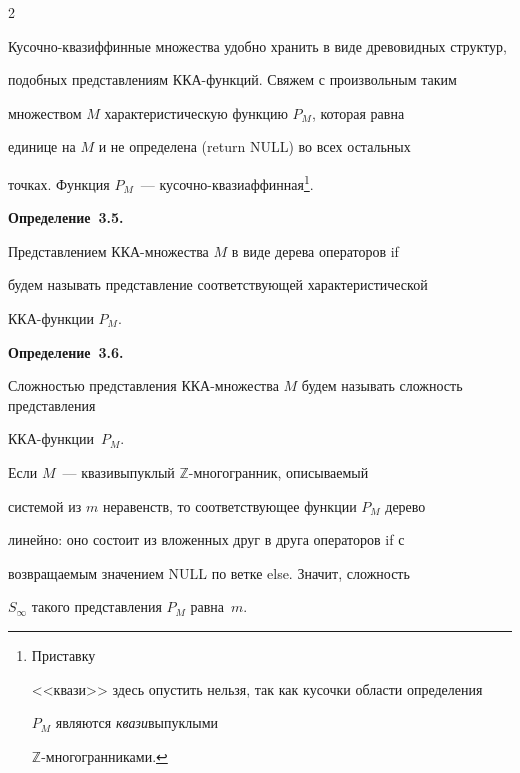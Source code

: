 \begin{multicols}{2}
\smallskip



Кусочно-квазиффинные множества удобно хранить в виде древовидных структур,

подобных представлениям ККА-функ\-ций. Свяжем с произвольным таким

множеством $M$ характеристическую функцию $P_M$, которая равна

единице на $M$ и не определена (return NULL) во всех остальных

точках. Функция $P_M$~--- ку\-соч\-но-ква\-зи\-аф\-фин\-ная\footnote{Приставку

<<квази>> здесь опустить нельзя, так как кусочки области определения

$P_M$ являются \textit{квази}выпуклыми

$\mathbb{Z}$-мно\-го\-гран\-ни\-ками.}.



\smallskip



\noindent

\textbf{Определение~3.5.}

Представлением ККА-мно\-жест\-ва $M$ в виде дерева операторов if

будем называть представление соответствующей характеристической

ККА-функции $P_M$.



\smallskip



\noindent

\textbf{Определение~3.6.}

Сложностью пред\-став\-ле\-ния ККА-мно\-же\-ст\-ва $M$ будем называть слож\-ность пред\-став\-ле\-ния 

ККА-функ\-ции~$P_M$.



\smallskip



Если $M$~---  квазивыпуклый $\mathbb{Z}$-мно\-го\-гран\-ник, описываемый

системой из $m$ неравенств, то соответствующее функции $P_M$ дерево

линейно: оно состоит из вложенных друг в друга операторов if с

возвращаемым значением NULL по ветке else. Значит, сложность

$S_\infty$ такого представления $P_M$ равна~$m$.






\end{multicols}

